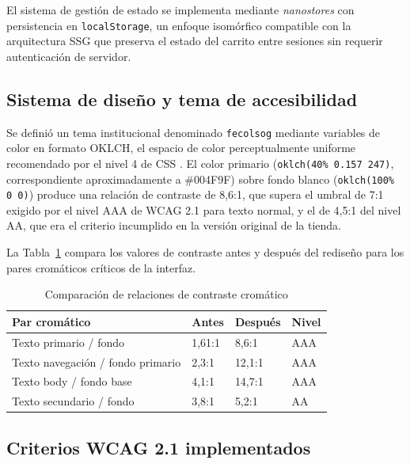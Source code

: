 \documentclass[conference]{IEEEtran}
\begin{document}
El sistema de gestión de estado se implementa mediante \textit{nanostores} con persistencia en \texttt{localStorage}, un enfoque isomórfico compatible con la arquitectura SSG que preserva el estado del carrito entre sesiones sin requerir autenticación de servidor.

\subsection{Sistema de diseño y tema de accesibilidad}

Se definió un tema institucional denominado \texttt{fecolsog} mediante variables de color en formato OKLCH, el espacio de color perceptualmente uniforme recomendado por el nivel 4 de CSS \cite{css-color-4}. El color primario (\texttt{oklch(40\% 0.157 247)}, correspondiente aproximadamente a \#004F9F) sobre fondo blanco (\texttt{oklch(100\% 0 0)}) produce una relación de contraste de 8,6:1, que supera el umbral de 7:1 exigido por el nivel AAA de WCAG 2.1 \cite{wcag-2018} para texto normal, y el de 4,5:1 del nivel AA, que era el criterio incumplido en la versión original de la tienda.

La Tabla~\ref{tab:contraste} compara los valores de contraste antes y después del rediseño para los pares cromáticos críticos de la interfaz.

\begin{table}[H]
\centering
\caption{Comparación de relaciones de contraste cromático}
\label{tab:contraste}
\setlength{\tabcolsep}{3pt}
\renewcommand{\arraystretch}{1.2}
\begin{tabular}{|p{2.5cm}|p{1.5cm}|p{1.5cm}|p{1.5cm}|}
\hline
\textbf{Par cromático} & \textbf{Antes} & \textbf{Después} & \textbf{Nivel} \\
\hline
Texto primario / fondo & 1,61:1 & 8,6:1 & AAA \\
\hline
Texto navegación / fondo primario & 2,3:1 & 12,1:1 & AAA \\
\hline
Texto body / fondo base & 4,1:1 & 14,7:1 & AAA \\
\hline
Texto secundario / fondo & 3,8:1 & 5,2:1 & AA \\
\hline
\end{tabular}
\end{table}

\subsection{Criterios WCAG 2.1 implementados}
\end{document}
